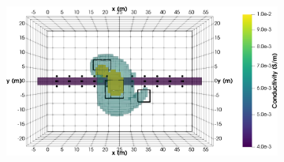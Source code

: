 \documentclass[preprint,authoryear,12pt]{elsarticle}
\begin{document}
\begin{figure}[htp]{}
\begin{center}
\begin{subfigure}{0.55\linewidth}
      \end{subfigure}
      \hspace{-4.0cm}
      \qquad
      \begin{subfigure}{0.55\linewidth}
         \label{fig:MultiBlk_StraightTunnel_4Linear_Top}
         \includegraphics[trim=0cm 0cm 0cm 0cm, clip=true,width=\linewidth]{./figures/Fig11d.png}
      \end{subfigure}
      \vspace{0.15cm}


\end{center}
\end{figure}
\end{document}
